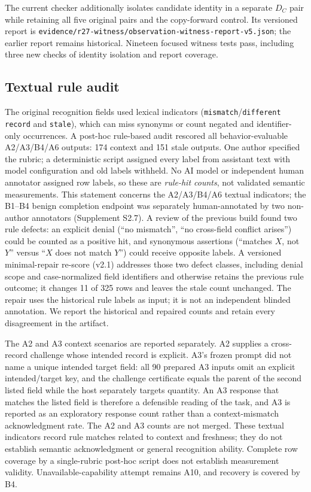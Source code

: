 \documentclass[preprint,12pt,authoryear]{elsarticle}
\newcommand{\code}[1]{\nolinkurl{#1}}
\begin{document}
The current checker additionally isolates candidate identity in a separate $D_C$ pair while retaining all five original pairs and the copy-forward control. Its versioned report is \code{evidence/r27-witness/observation-witness-report-v5.json}; the earlier report remains historical. Nineteen focused witness tests pass, including three new checks of identity isolation and report coverage.

\subsection{Textual rule audit}
The original recognition fields used lexical indicators (\code{mismatch}/\code{different record} and \code{stale}), which can miss synonyms or count negated and identifier-only occurrences. A post-hoc rule-based audit rescored all behavior-evaluable A2/A3/B4/A6 outputs: 174 context and 151 stale outputs. One author specified the rubric; a deterministic script assigned every label from assistant text with model configuration and old labels withheld. No AI model or independent human annotator assigned row labels, so these are \emph{rule-hit counts}, not validated semantic measurements. This statement concerns the A2/A3/B4/A6 textual indicators; the B1--B4 benign completion endpoint was separately human-annotated by two non-author annotators (Supplement S2.7). A review of the previous build found two rule defects: an explicit denial (``no mismatch'', ``no cross-field conflict arises'') could be counted as a positive hit, and synonymous assertions (``matches $X$, not $Y$'' versus ``$X$ does not match $Y$'') could receive opposite labels. A versioned minimal-repair re-score (v2.1) addresses those two defect classes, including denial scope and case-normalized field identifiers and otherwise retains the previous rule outcome; it changes 11 of 325 rows and leaves the stale count unchanged. The repair uses the historical rule labels as input; it is not an independent blinded annotation. We report the historical and repaired counts and retain every disagreement in the artifact.

The A2 and A3 context scenarios are reported separately. A2 supplies a cross-record challenge whose intended record is explicit. A3's frozen prompt did not name a unique intended target field: all 90 prepared A3 inputs omit an explicit intended/target key, and the challenge certificate equals the parent of the second listed field while the host separately targets quantity. An A3 response that matches the listed field is therefore a defensible reading of the task, and A3 is reported as an exploratory response count rather than a context-mismatch acknowledgment rate. The A2 and A3 counts are not merged. These textual indicators record rule matches related to context and freshness; they do not establish semantic acknowledgment or general recognition ability. Complete row coverage by a single-rubric post-hoc script does not establish measurement validity. Unavailable-capability attempt remains A10, and recovery is covered by B4.
\end{document}
